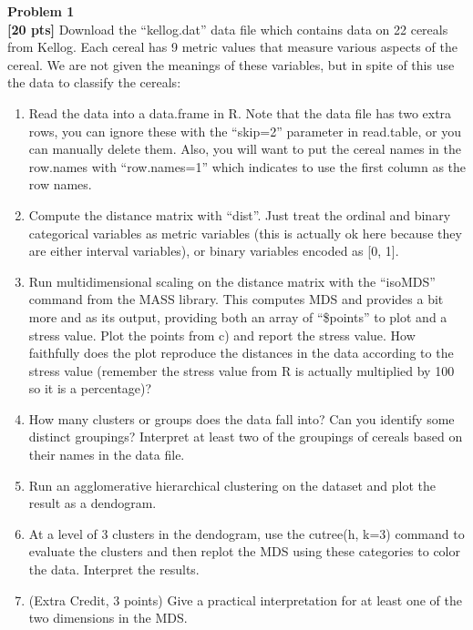 \documentclass{article}
\newenvironment{problem}[2][Problem]
    { \begin{mdframed}[backgroundcolor=gray!20] \textbf{#1 #2} \\}
    {  \end{mdframed}}
\begin{document}
\begin{problem}{1}
\textbf{[20 pts]}
Download the “kellog.dat” data file which contains data on 22 cereals from Kellog. Each cereal has 9 metric values that measure various aspects of the cereal. We are not given the meanings of these variables, but in spite of this use the data to classify the cereals:
\begin{enumerate}
	\item Read the data into a data.frame in R. Note that the data file has two extra rows, you can ignore these with the “skip=2” parameter in read.table, or you can manually delete them. Also, you will want to put the cereal names in the row.names with “row.names=1” which indicates to use the first column as the row names.
	\item Compute the distance matrix with “dist”. Just treat the ordinal and binary categorical variables as metric variables (this is actually ok here because they are either interval variables), or binary variables encoded as [0, 1].
	\item Run multidimensional scaling on the distance matrix with the “isoMDS” command from the MASS library. This computes MDS and provides a bit more and as its output, providing both an array of “\$points” to plot and a stress value. Plot the points from c) and report the stress value. How faithfully does the plot reproduce the distances in the data according to the stress value (remember the stress value from R is actually multiplied by 100 so it is a percentage)?
	\item How many clusters or groups does the data fall into? Can you identify some distinct groupings? Interpret at least two of the groupings of cereals based on their names in the data file.
	\item Run an agglomerative hierarchical clustering on the dataset and plot the result as a dendogram.
	\item At a level of 3 clusters in the dendogram, use the cutree(h, k=3) command to evaluate the clusters and then replot the MDS using these categories to color the data. Interpret the results.
	\item (Extra Credit, 3 points) Give a practical interpretation for at least one of the two dimensions in the MDS.
\end{enumerate}
\end{problem}
\end{document}
